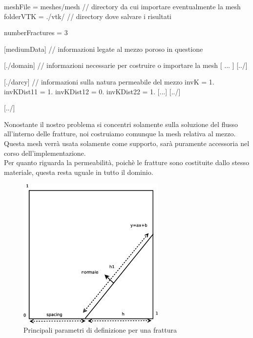 \begin{Code03_01}[caption={Definizione del dominio}]
meshFile = meshes/mesh		//   directory da cui importare eventualmente la mesh
folderVTK = ./vtk/				//   directory dove salvare i risultati

numberFractures = 3

[mediumData]					//   informazioni legate al mezzo poroso in questione

   [./domain]					//   informazioni necessarie per costruire o importare la mesh 
     [ ... ]
   [../]

   [./darcy]					//   informazioni sulla natura permeabile del mezzo
     invK = 1.
     invKDist11 = 1.
     invKDist12 = 0.
     invKDist22 = 1.
     [...]	
   [../]

[../]

\end{Code03_01}

\par \noindent Nonostante il nostro problema si concentri solamente sulla soluzione del flusso all'interno delle fratture, noi costruiamo comunque la mesh relativa al mezzo. Questa mesh verrà usata solamente come supporto, sarà puramente accessoria nel corso dell'implementazione. \\
 \noindent Per quanto riguarda la permeabilità, poichè le fratture sono costituite dallo stesso materiale, questa resta uguale in tutto il dominio. 

\begin{figure}[htbp]
\begin{center}
\includegraphics[width=0.65\textwidth]{img/cap2/mesh.eps}
\caption{Principali parametri di definizione per una frattura}
\end{center}
\end{figure}

